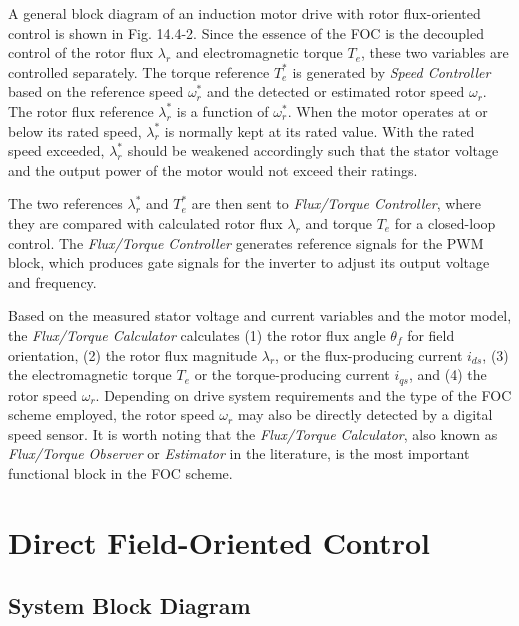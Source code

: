 \documentclass[letterpaper,12pt]{article}
\begin{document}
A general block diagram of an induction motor drive with rotor flux-oriented control is shown in Fig. 14.4-2. Since the essence of the FOC is the decoupled control of the rotor flux $\lambda_r$ and electromagnetic torque $T_e$, these two variables are controlled separately. The torque reference $T_e^*$ is generated by \textit{Speed Controller} based on the reference speed $\omega_r^*$ and the detected or estimated rotor speed $\omega_r$. The rotor flux reference $\lambda_r^*$ is a function of $\omega_r^*$. When the motor operates at or below its rated speed, $\lambda_r^*$ is normally kept at its rated value. With the rated speed exceeded, $\lambda_r^*$ should be weakened accordingly such that the stator voltage and the output power of the motor would not exceed their ratings.

The two references $\lambda_r^*$ and $T_e^*$ are then sent to \textit{Flux/Torque Controller}, where they are compared with calculated rotor flux $\lambda_r$ and torque $T_e$ for a closed-loop control. The \textit{Flux/Torque Controller} generates reference signals for the PWM block, which produces gate signals for the inverter to adjust its output voltage and frequency.

Based on the measured stator voltage and current variables and the motor model, the \textit{Flux/Torque Calculator} calculates (1) the rotor flux angle $\theta_f$ for field orientation, (2) the rotor flux magnitude $\lambda_r$, or the flux-producing current $i_{ds}$, (3) the electromagnetic torque $T_e$ or the torque-producing current $i_{qs}$, and (4) the rotor speed $\omega_r$. Depending on drive system requirements and the type of the FOC scheme employed, the rotor speed $\omega_r$ may also be directly detected by a digital speed sensor. It is worth noting that the \textit{Flux/Torque Calculator}, also known as \textit{Flux/Torque Observer} or \textit{Estimator} in the literature, is the most important functional block in the FOC scheme.

\clearpage
\section{Direct Field-Oriented Control}

\subsection{System Block Diagram}
\end{document}

